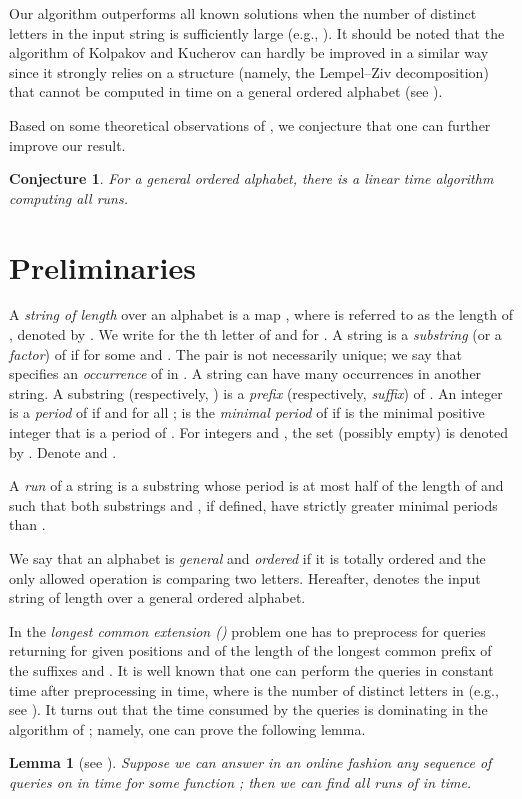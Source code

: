 \documentclass[3p,twocolumn]{elsarticle}
\theoremstyle{plain}
\newtheorem{lemma}{Lemma}
\newtheorem*{conjecture}{Conjecture}
\theoremstyle{definition}
\begin{document}
Our algorithm outperforms all known solutions when the number of distinct letters in the input string is sufficiently large (e.g., ). It should be noted that the algorithm of Kolpakov and Kucherov can hardly be improved in a similar way since it strongly relies on a structure (namely, the Lempel--Ziv decomposition) that cannot be computed in  time on a general ordered alphabet (see \cite{Kosolobov}).

Based on some theoretical observations of \cite{Kosolobov}, we conjecture that one can further improve our result.
\begin{conjecture}
For a general ordered alphabet, there is a linear time algorithm computing all runs.
\end{conjecture}


\section{Preliminaries}

A \emph{string of length } over an alphabet  is a map , where  is referred to as the length of , denoted by . We write  for the th letter of  and  for . A string  is a \emph{substring} (or a \emph{factor}) of  if  for some  and . The pair  is not necessarily unique; we say that  specifies an \emph{occurrence} of  in . A string can have many occurrences in another string. A substring  (respectively, ) is a \emph{prefix} (respectively, \emph{suffix}) of . An integer  is a \emph{period} of  if  and  for all ;  is the \emph{minimal period} of  if  is the minimal positive integer that is a period of . For integers  and , the set  (possibly empty) is denoted by . Denote  and .

A \emph{run} of a string  is a substring  whose period is at most half of the length of  and such that both substrings  and , if defined, have strictly greater minimal periods than .

We say that an alphabet is \emph{general} and \emph{ordered} if it is totally ordered and the only allowed operation is comparing two letters. Hereafter,  denotes the input string of length  over a general ordered alphabet.

In the \emph{longest common extension ()} problem one has to preprocess  for queries  returning for given positions  and  of  the length of the longest common prefix of the suffixes  and . It is well known that one can perform the  queries in constant time after preprocessing  in  time, where  is the number of distinct letters in  (e.g., see \cite{HarelTarjan}). It turns out that the time consumed by the  queries is dominating in the algorithm of \cite{BannaiIInenagaNakashimaTakedaTsuruta}; namely, one can prove the following lemma.
\begin{lemma}[{see \cite[Alg. 1 and Sect. 4.2]{BannaiIInenagaNakashimaTakedaTsuruta}}]
Suppose we can answer in an online fashion any sequence of   queries on  in  time for some function ; then we can find all runs of  in  time.\label{LCEtoRuns}
\end{lemma}
\end{document}
